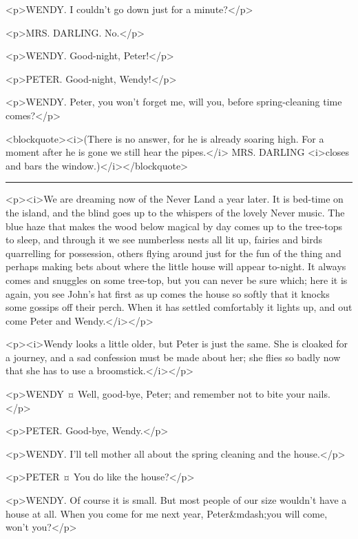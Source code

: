 <p>WENDY. I couldn't go down just for a minute?</p>

<p>MRS. DARLING. No.</p>

<p>WENDY. Good-night, Peter!</p>

<p>PETER. Good-night, Wendy!</p>

<p>WENDY. Peter, you won't forget me, will you, before spring-cleaning time comes?</p>

<blockquote><i>(There is no answer, for he is already soaring high. For a moment after he is gone we still hear the pipes.</i> MRS. DARLING <i>closes and bars the window.)</i></blockquote>

\plainbreak{1}

<p><i>We are dreaming now of the Never Land a year later. It is bed-time on the island, and the blind goes up to the whispers of the lovely Never music. The blue haze that makes the wood below magical by day comes up to the tree-tops to sleep, and through it we see numberless nests all lit up, fairies and birds quarrelling for possession, others flying around just for the fun of the thing and perhaps making bets about where the little house will appear to-night. It always comes and snuggles on some tree-top, but you can never be sure which; here it is again, you see John's hat first as up comes the house so softly that it knocks some gossips off their perch. When it has settled comfortably it lights up, and out come Peter and Wendy.</i></p>

<p><i>Wendy looks a little older, but Peter is just the same. She is cloaked for a journey, and a sad confession must be made about her; she flies so badly now that she has to use a broomstick.</i></p>

<p>WENDY ¤
Well, good-bye, Peter; and remember not to bite your nails.</p>

<p>PETER. Good-bye, Wendy.</p>

<p>WENDY. I'll tell mother all about the spring cleaning and the house.</p>

<p>PETER ¤
You do like the house?</p>

<p>WENDY. Of course it is small. But most people of our size wouldn't have a house at all.
When you come for me next year, Peter&mdash;you will come, won't you?</p>

